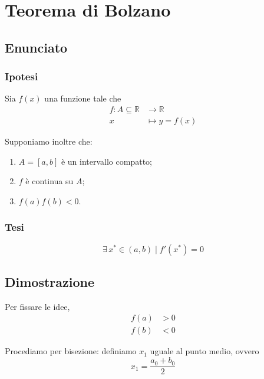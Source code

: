 \documentclass[../../dimostrazioni]{subfiles}
\begin{document}
    \chapter{Teorema di Bolzano}

        \section*{Enunciato}

            \subsection*{Ipotesi}

                Sia \(f(x)\) una funzione tale che
                \begin{align*}
                    f : A \subseteq \mathbb{R} &\longrightarrow \mathbb{R}\\
                    x &\longmapsto y = f(x) 
                \end{align*}

                Supponiamo inoltre che:

                \begin{enumerate}
                    \indentitem \item \(A = [a, b]\) è un intervallo compatto;
                    \indentitem \item \(f\) è continua su \(A\);
                    \indentitem \item \(f(a) f(b) < 0\).
                \end{enumerate}

            \subsection*{Tesi}
            
                \[\exists \, x^* \in (a,b) \; | \; f'(x^*) = 0 \]

        \section*{Dimostrazione}

            Per fissare le idee,
            \begin{align*}
                f(a) &> 0\\
                f(b) &< 0
            \end{align*}

            Procediamo per bisezione: definiamo \(x_1\) uguale al punto medio, ovvero
            \[
                x_1 = \frac{a_0 + b_0}{2}
            \]
\end{document}
